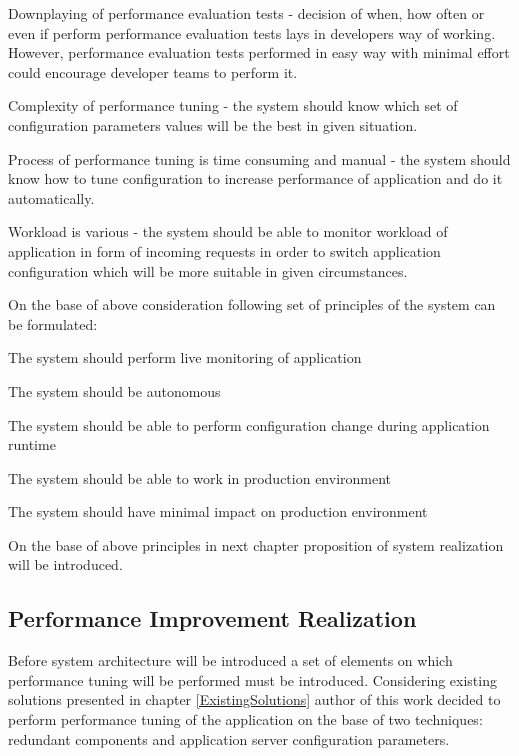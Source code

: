 \documentclass[10pt,a4paper]{article}
\let\tempone\itemize
\let\temptwo\enditemize
\renewenvironment{itemize}{\tempone\addtolength{\itemsep}{-0.4\baselineskip}}{\temptwo}
\let\tempone\enumerate
\let\temptwo\endenumerate
\begin{document}
Downplaying of performance evaluation tests - decision of when, how often or even if perform performance evaluation tests lays in developers way of working. However, performance evaluation tests performed in easy way with minimal effort could encourage developer teams to perform it. 

Complexity of performance tuning - the system should know which set of configuration parameters values will be the best in given situation.  

Process of performance tuning is time consuming and manual - the system should know how to tune configuration to increase performance of application and do it automatically. 

Workload is various - the system should be able to monitor workload of application in form of incoming requests in order to switch application configuration which will be more suitable in given circumstances. 

On the base of above consideration following set of principles of the system can be formulated:

\begin{itemize}
\item The system should perform live monitoring of application
\item The system should be autonomous
\item The system should be able to perform configuration change during application runtime
\item The system should be able to work in production environment
\item The system should have minimal impact on production environment
\end{itemize}

On the base of above principles in next chapter proposition of system realization will be introduced.  

\subsection{Performance Improvement Realization}

Before system architecture will be introduced a set of elements on which performance tuning will be performed must be introduced.  
Considering existing solutions presented in chapter \ref{ExistingSolutions} author of this work decided to perform performance tuning of the application on the base of two techniques: redundant components and application server configuration parameters. 
\end{document}
